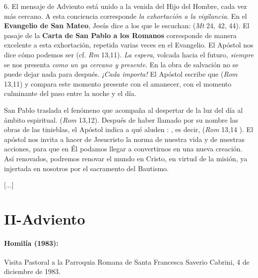 \begin{body}
\begin{body}
		6. El mensaje de Adviento está unido a la venida del Hijo del Hombre, cada vez más cercano. A esta conciencia corresponde \emph{la exhortación a la vigilancia}. En el \textbf{Evangelio de San Mateo}, Jesús dice a los que le escuchan:  (\emph{Mt} 24, 42, 44). El pasaje de la \textbf{Carta de San Pablo a los Romanos} corresponde de manera excelente a esta exhortación, repetida varias veces en el Evangelio. El Apóstol nos dice cómo podemos ser \emph{} (cf. \emph{Rm} 13,11). \emph{La espera}, volcada hacia el futuro, \emph{siempre} se nos presenta \emph{como un  ya cercano y presente}. En la obra de salvación no se puede dejar nada para después. \emph{¡Cada  importa!} El Apóstol escribe que  (\emph{Rom} 13,11) y compara este momento presente con el amanecer, con el momento culminante del paso entre la noche y el día.
		
		San Pablo traslada el fenómeno que acompaña al despertar de la luz del día al ámbito espiritual.  (\emph{Rom} 13,12). Después de haber llamado por su nombre las obras de las tinieblas, el Apóstol indica a qué aluden : \emph{}, es decir,  (\emph{Rom} 13,14 ). El apóstol nos invita a hacer de Jesucristo la norma de nuestra vida y de nuestras acciones, para que en Él podamos llegar a convertirnos en una nueva creación. Así renovados, podremos renovar el mundo en Cristo, en virtud de la misión, ya injertada en nosotros por el sacramento del Bautismo.
		
		{[}...{]}
	\end{body}
	
	\chapter{II-Adviento}
	
	\subsubsection{Homilía (1983): } Visita Pastoral a la Parroquia Romana de Santa Francesca Saverio Cabrini, 4 de diciembre de 1983.
	

\end{body}
